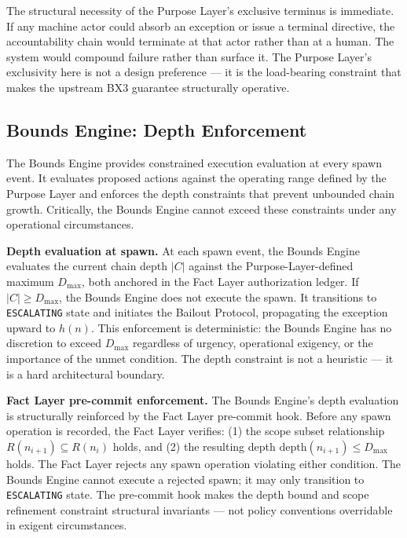 \medskip
The structural necessity of the Purpose Layer's exclusive terminus is immediate. If any machine actor could absorb an exception or issue a terminal directive, the accountability chain would terminate at that actor rather than at a human. The system would compound failure rather than surface it. The Purpose Layer's exclusivity here is not a design preference — it is the load-bearing constraint that makes the upstream BX3 guarantee structurally operative.

\subsection{Bounds Engine: Depth Enforcement}
\label{sec:rs-bounds-depth}

The Bounds Engine provides constrained execution evaluation at every spawn event. It evaluates proposed actions against the operating range defined by the Purpose Layer and enforces the depth constraints that prevent unbounded chain growth. Critically, the Bounds Engine cannot exceed these constraints under any operational circumstances.

\medskip
\noindent\textbf{Depth evaluation at spawn.} At each spawn event, the Bounds Engine evaluates the current chain depth $|C|$ against the Purpose-Layer-defined maximum $D_{\mathrm{max}}$, both anchored in the Fact Layer authorization ledger. If $|C| \geq D_{\mathrm{max}}$, the Bounds Engine does not execute the spawn. It transitions to \texttt{ESCALATING} state and initiates the Bailout Protocol, propagating the exception upward to $h(n)$. This enforcement is deterministic: the Bounds Engine has no discretion to exceed $D_{\mathrm{max}}$ regardless of urgency, operational exigency, or the importance of the unmet condition. The depth constraint is not a heuristic — it is a hard architectural boundary.

\medskip
\noindent\textbf{Fact Layer pre-commit enforcement.} The Bounds Engine's depth evaluation is structurally reinforced by the Fact Layer pre-commit hook. Before any spawn operation is recorded, the Fact Layer verifies: (1) the scope subset relationship $R(n_{i+1}) \subseteq R(n_i)$ holds, and (2) the resulting depth $\mathrm{depth}(n_{i+1}) \leq D_{\mathrm{max}}$ holds. The Fact Layer rejects any spawn operation violating either condition. The Bounds Engine cannot execute a rejected spawn; it may only transition to \texttt{ESCALATING} state. The pre-commit hook makes the depth bound and scope refinement constraint structural invariants — not policy conventions overridable in exigent circumstances.


